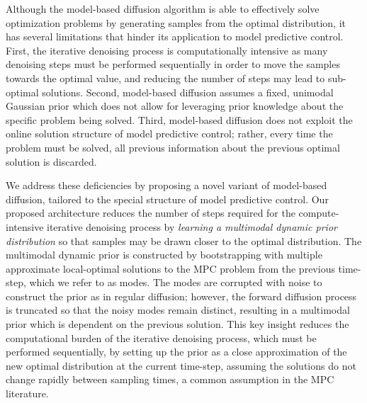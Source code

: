 \documentclass[letterpaper, 10 pt, conference]{IEEEconf}
\begin{document}
Although the model-based diffusion algorithm is able to effectively solve optimization problems by generating samples from the optimal distribution, it has several limitations that hinder its application to model predictive control.
First, the iterative denoising process is computationally intensive as many denoising steps must be performed sequentially in order to move the samples towards the optimal value, and reducing the number of steps may lead to sub-optimal solutions.
Second, model-based diffusion assumes a fixed, unimodal Gaussian prior which does not allow for leveraging prior knowledge about the specific problem being solved.
Third, model-based diffusion does not exploit the online solution structure of model predictive control; rather, every time the problem must be solved, all previous information about the previous optimal solution is discarded.

We address these deficiencies by proposing a novel variant of model-based diffusion, tailored to the special structure of model predictive control.
Our proposed architecture reduces the number of steps required for the compute-intensive iterative denoising process by \emph{learning a multimodal dynamic prior distribution} so that samples may be drawn closer to the optimal distribution.
The multimodal dynamic prior is constructed by bootstrapping with multiple approximate local-optimal solutions to the MPC problem from the previous time-step, which we refer to as modes.
The modes are corrupted with noise to construct the prior as in regular diffusion; however, the forward diffusion process is truncated so that the noisy modes remain distinct, resulting in a multimodal prior which is dependent on the previous solution.
This key insight reduces the computational burden of the iterative denoising process, which must be performed sequentially, by setting up the prior as a close approximation of the new optimal distribution at the current time-step, assuming the solutions do not change rapidly between sampling times, a common assumption in the MPC literature.
\end{document}
